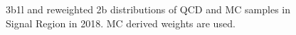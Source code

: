 \begin{figure}[ht]
 

    \caption{3b1l and reweighted 2b distributions of QCD and \ttbar MC samples in Signal Region in 2018.
             MC derived weights are used.}
    \label{fig:mc-weights-3b1l-SR-2018}
\end{figure}


